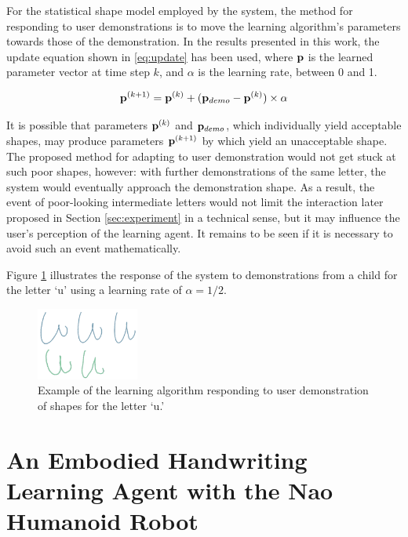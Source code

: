 \documentclass{sig-alternate}
\begin{document}
For the statistical shape model employed by the system, the method for
responding to user demonstrations is to move the learning algorithm's parameters
towards those of the demonstration. In the results presented in this work, the
update equation shown in \ref{eq:update} has been used, where ${\bf p}$ is the
learned parameter vector at time step $k$, and $\alpha$ is the learning rate,
between 0 and 1.  

\begin{equation}\label{eq:update}
{\bf p}^{(k+1)} = {\bf p}^{(k)} + ({\bf p}_{demo}-{\bf
p}^{(k)})\times\alpha
\end{equation}

It is possible that parameters ${\bf p}^{(k)}$ and ${\bf p}_{demo}$, which
individually yield acceptable shapes, may produce parameters ${\bf p}^{(k+1)}$
by which yield an unacceptable shape. The proposed method for adapting to user
demonstration would not get stuck at such poor shapes, however: with further
demonstrations of the same letter, the system would eventually approach the
demonstration shape. As a result, the event of poor-looking intermediate letters
would not limit the interaction later proposed in Section \ref{sec:experiment}
in a technical sense, but it may influence the user's perception of the learning
agent. It remains to be seen if it is necessary to avoid such an event
mathematically.

Figure \ref{fig:demonstrationShapes2} illustrates the response of the system to
demonstrations from a child for the letter `u' using a learning rate of
$\alpha=1/2$. 

\begin{figure}[thpb]
    \centering
    \includegraphics[width=0.3\textwidth]{figures/u_kids.png}
    \caption{\label{fig:demonstrationShapes2}Example of the learning algorithm
    responding to user demonstration of shapes for the letter `u.'}
\end{figure}

%
%



\section{An Embodied Handwriting Learning Agent with the Nao Humanoid Robot}
\label{sec:robotWriting}
\end{document}
